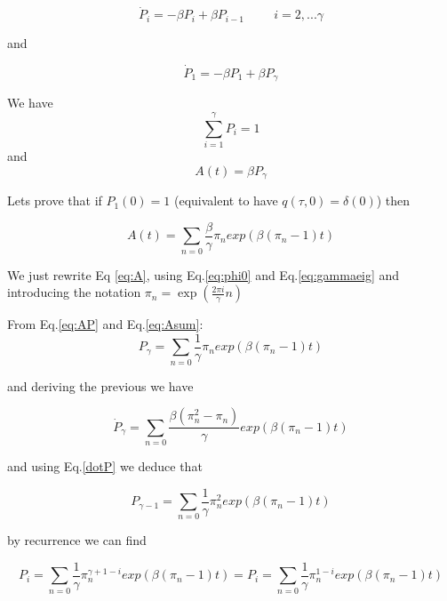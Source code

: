 \documentclass[a4paper,12pt,twoside]{article}
\begin{document}
\begin{equation}
\label{dotP}
\dot{P}_i=-\beta P_i+\beta P_{i-1} \hspace{1cm} i=2,...\gamma
\end{equation}

and 

\begin{equation}
\label{dotP1}
\dot{P}_1=-\beta P_1+\beta P_{\gamma}
\end{equation}

We have 
\begin{equation}
\sum_{i=1}^{\gamma}P_i=1
\end{equation}
 and 
 \begin{equation}
 \label{eq:AP}
A(t)=\beta P_\gamma
 \end{equation}
 
 Lets prove that  if $P_1(0)=1$ (equivalent to have $q(\tau,0)=\delta(0)$) then 

 
  \begin{equation}
   \label{eq:Asum}
 A(t)=\sum_{n=0}\frac{\beta}{\gamma}\pi_n exp(\beta(\pi_n-1)t)
  \end{equation}

We just rewrite Eq \eqref{eq:A}, using Eq.\eqref{eq:phi0} and Eq.\eqref{eq:gammaeig} and  introducing the notation $\pi_n= \exp\left(\frac{2\pi i}{\gamma}n\right)$

From Eq.\eqref{eq:AP} and Eq.\eqref{eq:Asum}:
 \begin{equation}
  P_\gamma=\sum_{n=0}\frac{1}{\gamma}\pi_n exp(\beta(\pi_n-1)t)
 \end{equation}
 
 and deriving the previous we have
 
 \begin{equation}
 \dot{P}_\gamma=\sum_{n=0}\frac{\beta(\pi_n^2-\pi_n)}{\gamma}exp(\beta(\pi_n-1)t)
 \end{equation}
 
 and using Eq.\eqref{dotP} we deduce that
 
 \begin{equation}
  P_{\gamma-1}=\sum_{n=0}\frac{1}{\gamma}\pi_n^2 exp(\beta(\pi_n-1)t)
 \end{equation}
 
 by recurrence we can find
 
 \begin{equation}
 \label{eq:Pi}
P_{i}=\sum_{n=0}\frac{1}{\gamma}\pi_n^{\gamma+1-i} exp(\beta(\pi_n-1)t)=P_{i}=\sum_{n=0}\frac{1}{\gamma}\pi_n^{1-i} exp(\beta(\pi_n-1)t)
\end{equation}
\end{document}
